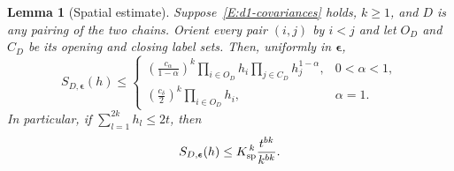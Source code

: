 \documentclass[12pt,oneside,openany]{book}
\makeatletter
\let\lean@pending\@empty
\newcommand{\LeanMarker}[1]{\gdef\lean@pending{#1}}
\numberwithin{equation}{section}
\newtheorem{lemma}[theorem]{Lemma}
\theoremstyle{nogostyle}
\theoremstyle{definition}
\makeatother
\begin{document}
\LeanMarker{L:d1-spatial}
\begin{lemma}[Spatial estimate]\label{L:d1-spatial}
  Suppose~\eqref{E:d1-covariances} holds, $k \ge 1$, and $D$ is any pairing of
  the two chains. Orient every pair $(i,j)$ by $i < j$ and let $O_D$ and $C_D$
  be its opening and closing label sets. Then, uniformly in
  $\boldsymbol\epsilon$,
  \begin{equation}\label{E:d1-spatial-product}
    S_{D,\boldsymbol\epsilon}(h)\le
    \begin{cases}
      \displaystyle\left(\frac{c_\alpha}{1-\alpha}\right)^k
      \prod_{i\in O_D}h_i\prod_{j\in C_D}h_j^{1-\alpha},
      &0<\alpha<1,\\[2mm]
      \displaystyle\left(\frac{c_\delta}{2}\right)^k
      \prod_{i\in O_D}h_i,&\alpha=1.
    \end{cases}
  \end{equation}
  In particular, if $\sum_{l=1}^{2k}h_l \le 2t$, then
  \begin{equation}\label{E:d1-spatial-max}
    S_{D,\boldsymbol\epsilon}(h)
    \le K_{\rm sp}^{\,k}\frac{t^{bk}}{k^{bk}}.
  \end{equation}
\end{lemma}
\end{document}
